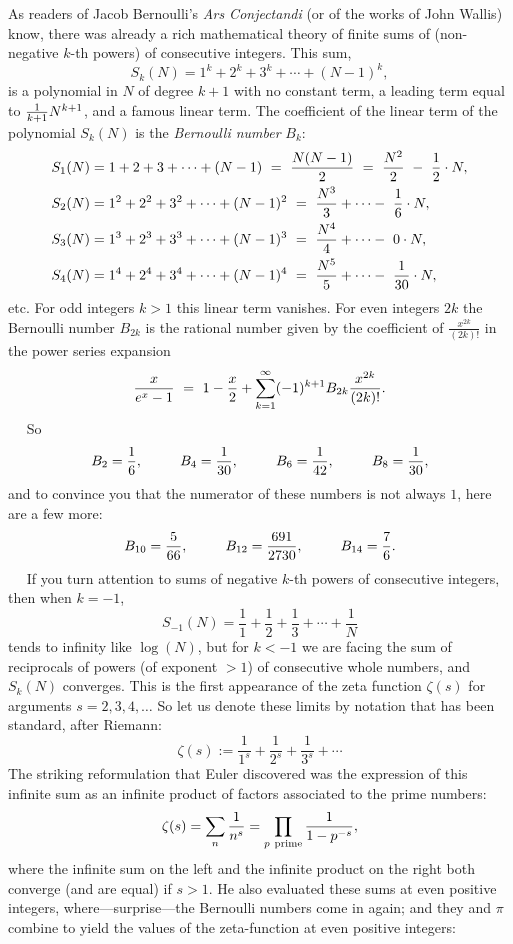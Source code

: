 \documentclass[openany]{book}
\theoremstyle{plain}
\theoremstyle{definition}
\begin{document}
{{As readers of Jacob Bernoulli's {\it Ars Conjectandi} (or of the works
of John Wallis) know, there was already a rich mathematical theory of
finite sums of (non-negative $k$-th powers) of consecutive integers.
This sum, $$S_k(N) = 1^k+2^k+3^k+\cdots +(N-1)^k,$$ is a polynomial
in $N$ of degree $k+1$ with no constant term, a leading term equal to
${1\over k+1}N^{k+1}$, and a famous linear term.  The coefficient of
the linear term of the polynomial $S_k(N)$ is the {\it Bernoulli
  number} $B_{k}$:
\begin{align*}
S_1(N) &= 1+2+3+ \dots + (N-1) \ = \ {N(N-1)\over 2}  \ = \  {N^2\over 2}\ -\  {1\over 2}\cdot N,\\
S_2(N) &= 1^2+2^2+3^2+ \dots + (N-1)^2 \ = \   {N^3\over 3} +\cdots -\ {1\over 6}\cdot N,\\
S_3(N) &= 1^3+2^3+3^3+ \dots + (N-1)^3 \ = \  {N^4\over 4} +\cdots  -\ 0\cdot N,\\
S_4(N) &= 1^4+2^4+3^4+ \dots + (N-1)^4 \ = \  {N^5\over 5} +\cdots  -\ {1\over 30}\cdot N,
\end{align*}
etc.
For odd integers $k
> 1$ this linear term vanishes.  For even integers $2k$ the  Bernoulli number
$B_{2k}$ is the rational number given by the coefficient
of $\frac{x^{2k}}{(2k)!}$ in the power series expansion
\    \newline \bigskip \     \newline
$${x\over e^x-1} \ = \  1 - {x\over 2} +  \sum_{k=1}^{\infty}
(-1)^{k+1}B_{2k}{x^{2k}\over{(2k)}!}.$$
\    \newline \bigskip \     \newline
So
  $$ B_2 = {1\over 6},\ \ \ \ \ \ \ \   B_4 = {1\over 30},\ \ \ \ \ \ \ \   B_6 = {1\over 42},\ \ \ \ \ \ \
\   B_8 = {1\over 30},$$ and to convince you that the numerator of these numbers is not always $1$, here are
a few more:
$$B_{10} = {5\over 66},\ \ \ \ \ \ \ \   B_{12}= {691\over 2730},\ \ \ \ \ \ \ \  B_{14} = {7\over 6}.$$
\    \newline \bigskip \     \newline
If you turn attention to sums of negative $k$-th powers of consecutive
integers, then when $k= -1$, $$S_{-1}(N)= {\frac{1}{1}}+
{\frac{1}{2}}+ {\frac{1}{3}}+ \cdots+ {\frac{1}{N}}$$ tends to infinity
like $\log(N)$, but for $k < -1$ we are facing the sum of reciprocals
of powers (of exponent $>1$) of consecutive whole numbers, and
$S_k(N)$ converges. This is the first appearance of the zeta function
$\zeta(s)$ for arguments $s=2,3,4,\dots$ So let us denote these limits
by notation that has been standard, after Riemann:
$$\zeta(s):=  {\frac{1}{1^s}}+ {\frac{1}{2^s}}+ {\frac{1}{3^s}}+ \cdots$$
The striking reformulation that Euler discovered was the expression of
this infinite sum as an infinite product of factors associated to the
prime numbers:
$$
\zeta(s)=\sum_n{\frac{1}{n^s}} =
\prod_{p \ {\rm prime}}{\frac{1}{1-p^{-s}}},
$$
where the infinite sum on the left and the infinite product on the
right both converge (and are equal) if $s > 1$. He also evaluated these
sums at even positive integers, where---surprise---the Bernoulli
numbers come in again; and they and $\pi$ combine to yield the values of the zeta-function at even positive integers:

}}
\end{document}
